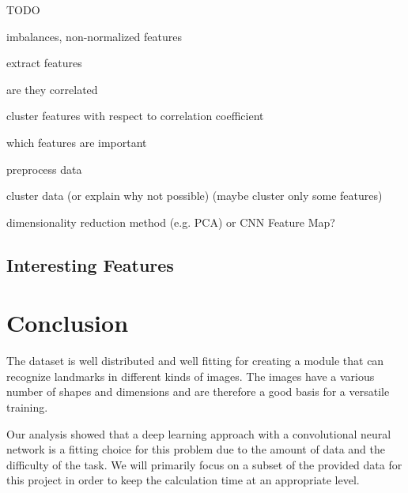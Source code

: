 TODO

imbalances, non-normalized features

extract features

are they correlated

cluster features with respect to correlation coefficient

which features are important

preprocess data

cluster data (or explain why not possible) (maybe cluster only some features)

dimensionality reduction method (e.g. PCA) or CNN Feature Map?

\section*{Interesting Features}

\chapter{Conclusion}

The dataset is well distributed and well fitting for creating a module that can recognize landmarks in different kinds of images. The images have a various number of shapes and dimensions and are therefore a good basis for a versatile training.

Our analysis showed that a deep learning approach with a convolutional neural network is a fitting choice for this problem due to the amount of data and the difficulty of the task. We will primarily focus on a subset of the provided data for this project in order to keep the calculation time at an appropriate level.
